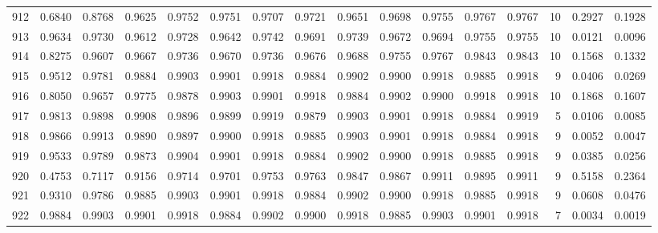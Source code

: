 \begin{tabular}{lrrrrrrrrrrrrrrr}
912 &      0.6840 &  0.8768 &  0.9625 &  0.9752 &  0.9751 &  0.9707 &  0.9721 &  0.9651 &  0.9698 &  0.9755 &   0.9767 &     0.9767 &     10 &                    0.2927 &                     0.1928 \\
913 &      0.9634 &  0.9730 &  0.9612 &  0.9728 &  0.9642 &  0.9742 &  0.9691 &  0.9739 &  0.9672 &  0.9694 &   0.9755 &     0.9755 &     10 &                    0.0121 &                     0.0096 \\
914 &      0.8275 &  0.9607 &  0.9667 &  0.9736 &  0.9670 &  0.9736 &  0.9676 &  0.9688 &  0.9755 &  0.9767 &   0.9843 &     0.9843 &     10 &                    0.1568 &                     0.1332 \\
915 &      0.9512 &  0.9781 &  0.9884 &  0.9903 &  0.9901 &  0.9918 &  0.9884 &  0.9902 &  0.9900 &  0.9918 &   0.9885 &     0.9918 &      9 &                    0.0406 &                     0.0269 \\
916 &      0.8050 &  0.9657 &  0.9775 &  0.9878 &  0.9903 &  0.9901 &  0.9918 &  0.9884 &  0.9902 &  0.9900 &   0.9918 &     0.9918 &     10 &                    0.1868 &                     0.1607 \\
917 &      0.9813 &  0.9898 &  0.9908 &  0.9896 &  0.9899 &  0.9919 &  0.9879 &  0.9903 &  0.9901 &  0.9918 &   0.9884 &     0.9919 &      5 &                    0.0106 &                     0.0085 \\
918 &      0.9866 &  0.9913 &  0.9890 &  0.9897 &  0.9900 &  0.9918 &  0.9885 &  0.9903 &  0.9901 &  0.9918 &   0.9884 &     0.9918 &      9 &                    0.0052 &                     0.0047 \\
919 &      0.9533 &  0.9789 &  0.9873 &  0.9904 &  0.9901 &  0.9918 &  0.9884 &  0.9902 &  0.9900 &  0.9918 &   0.9885 &     0.9918 &      9 &                    0.0385 &                     0.0256 \\
920 &      0.4753 &  0.7117 &  0.9156 &  0.9714 &  0.9701 &  0.9753 &  0.9763 &  0.9847 &  0.9867 &  0.9911 &   0.9895 &     0.9911 &      9 &                    0.5158 &                     0.2364 \\
921 &      0.9310 &  0.9786 &  0.9885 &  0.9903 &  0.9901 &  0.9918 &  0.9884 &  0.9902 &  0.9900 &  0.9918 &   0.9885 &     0.9918 &      9 &                    0.0608 &                     0.0476 \\
922 &      0.9884 &  0.9903 &  0.9901 &  0.9918 &  0.9884 &  0.9902 &  0.9900 &  0.9918 &  0.9885 &  0.9903 &   0.9901 &     0.9918 &      7 &                    0.0034 &                     0.0019 \\

\end{tabular}
